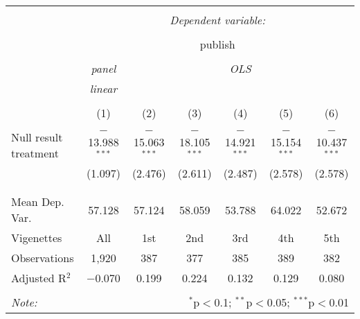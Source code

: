 
\begin{table}[!htbp] \centering 
  \caption{} 
  \label{} 
\begin{tabular}{@{\extracolsep{5pt}}lcccccc} 
\\[-1.8ex]\hline 
\hline \\[-1.8ex] 
 & \multicolumn{6}{c}{\textit{Dependent variable:}} \\ 
\cline{2-7} 
\\[-1.8ex] & \multicolumn{6}{c}{publish} \\ 
\\[-1.8ex] & \textit{panel} & \multicolumn{5}{c}{\textit{OLS}} \\ 
 & \textit{linear} & \multicolumn{5}{c}{\textit{}} \\ 
\\[-1.8ex] & (1) & (2) & (3) & (4) & (5) & (6)\\ 
\hline \\[-1.8ex] 
 Null result treatment & $-$13.988$^{***}$ & $-$15.063$^{***}$ & $-$18.105$^{***}$ & $-$14.921$^{***}$ & $-$15.154$^{***}$ & $-$10.437$^{***}$ \\ 
  & (1.097) & (2.476) & (2.611) & (2.487) & (2.578) & (2.578) \\ 
  & & & & & & \\ 
\hline \\[-1.8ex] 
Mean Dep. Var. & 57.128 & 57.124 & 58.059 & 53.788 & 64.022 & 52.672 \\ 
Vigenettes & All & 1st & 2nd & 3rd & 4th & 5th \\ 
Observations & 1,920 & 387 & 377 & 385 & 389 & 382 \\ 
Adjusted R$^{2}$ & $-$0.070 & 0.199 & 0.224 & 0.132 & 0.129 & 0.080 \\ 
\hline 
\hline \\[-1.8ex] 
\textit{Note:}  & \multicolumn{6}{r}{$^{*}$p$<$0.1; $^{**}$p$<$0.05; $^{***}$p$<$0.01} \\ 
\end{tabular} 
\end{table} 

